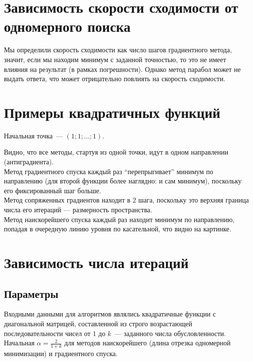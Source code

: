 \documentclass[russian, english]{article}
\begin{document}
\section{Зависимость скорости сходимости от одномерного поиска}
Мы определили скорость сходимости как число шагов градиентного метода, значит, если мы находим минимум с заданной точностью, то это не имеет влияния на результат (в рамках погрешности). Однако метод парабол может не выдать ответа, что может отрицательно повлиять на скорость сходимости.

\section{Примеры квадратичных функций}
Начальная точка~--- $(1;1;\dots;1)$.
\par
\noindent{}
\newpage
\noindent{}
\newpage
\noindent{}
\par
Видно, что все методы, стартуя из одной точки, идут в одном направлении (антиградиента). \\
Метод градиентного спуска каждый раз ``перепрыгивает'' минимум по направлению (для второй функции более наглядно: и сам минимум), поскольку его фиксированный шаг больше. \\
Метод сопряженных градиентов находит в 2 шага, поскольку это верхняя граница числа его итераций --- размерность пространства. \\
Метод наискорейшего спуска каждый раз находит минимум по направлению, попадая в очередную линию уровня по касательной, что видно на картинке.
\section{Зависимость числа итераций}
\subsection{Параметры}

Входными данными для алгоритмов являлись квадратичные функции с диагональной матрицей, составленной из строго возрастающей последовательности чисел от 1 до $k$~--- заданного числа обусловленности. Начальная $\alpha=\frac{2}{1+k}$ для методов наискорейшего (длина отрезка одномерной минимизации) и градиентного спуска.
\end{document}

